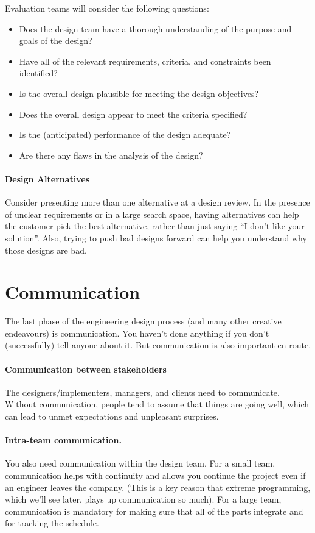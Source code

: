 Evaluation teams will consider the following questions:
\begin{itemize}
\item Does the design team have a thorough understanding of the purpose and goals of the design?
\item Have all of the relevant requirements, criteria, and constraints been identified?
\item Is the overall design plausible for meeting the design objectives?
\item Does the overall design appear to meet the criteria specified?
\item Is the (anticipated) performance of the design adequate?
\item Are there any flaws in the analysis of the design?
\end{itemize}

\paragraph{Design Alternatives} Consider presenting more than one alternative
at a design
review. In
the presence of unclear requirements or in a large search space,
having alternatives can help the customer pick the best alternative,
rather than just saying ``I don't like your solution''. Also, trying
to push bad designs forward can help you understand why those designs
are bad.

\section*{Communication} The last phase of the engineering design 
process (and many other creative endeavours) is communication. You
haven't done anything if you don't (successfully) tell anyone about
it. But communication is also important en-route.

\paragraph{Communication between stakeholders} 
The designers/implementers, managers, and clients need to communicate.
Without communication, people tend to assume that things are going well,
which can lead to unmet expectations and unpleasant surprises.

\paragraph{Intra-team communication.} You also need
communication within the design team. For a small team, communication
helps with continuity and allows you continue the project even if an
engineer leaves the company. (This is a key reason that extreme
programming, which we'll see later, plays up communication so
much). For a large team, communication is mandatory for making sure
that all of the parts integrate and for tracking the schedule.

